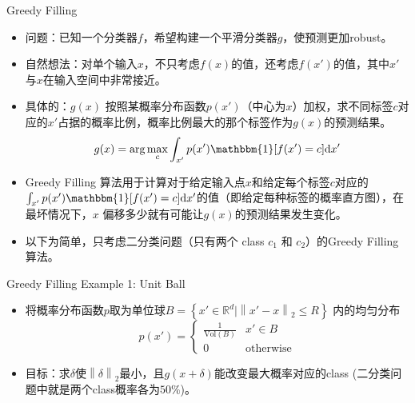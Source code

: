 \begin{frame}[fragile]{Greedy Filling}
    \begin{itemize}
        \item 问题：已知一个分类器$f$，希望构建一个平滑分类器$g$，使预测更加robust。
        \item 自然想法：对单个输入$x$，不只考虑$f(x)$的值，还考虑$f(x')$的值，其中$x'$与$x$在输入空间中非常接近。
        \item 具体的：$g(x)$ 按照某概率分布函数$p(x')$（中心为$x$）加权，求不同标签$c$对应的$x'$占据的概率比例，概率比例最大的那个标签作为$g(x)$的预测结果。
        \[
            g(x) = \text{arg}\max_{c} \int_{x'} p(x') \mathbbm{1} [f(x') = c] \mathrm{d}x'
        \]
        \item Greedy Filling 算法用于计算对于给定输入点$x$和给定每个标签$c$对应的$\int_{x'} p(x') \mathbbm{1} [f(x') = c] \mathrm{d}x'$的值（即给定每种标签的概率直方图），在最坏情况下，$x$ 偏移多少就有可能让$g(x)$的预测结果发生变化。
        \item 以下为简单，只考虑二分类问题（只有两个 class $c_1$ 和 $c_2$）的Greedy Filling算法。
    \end{itemize}
\end{frame}

\begin{frame}[fragile]{Greedy Filling Example 1: Unit Ball}
    \begin{itemize}
        \item 将概率分布函数$p$取为单位球$B = \left\{x'\in \mathbb{R}^{d} | \left\| x' - x \right\| _2 \leqslant R \right\} $ 内的均匀分布
        \[
            p(x') = \begin{cases}
                \frac{1}{\text{Vol}(B)} & x' \in B \\
                0 & \text{otherwise}
            \end{cases}
        \]
        \item 目标：求$\delta$使$\left\| \delta \right\|_2 $最小，且$g(x+\delta)$能改变最大概率对应的class (二分类问题中就是两个class概率各为$50\%$)。
    \end{itemize}
\end{frame}

